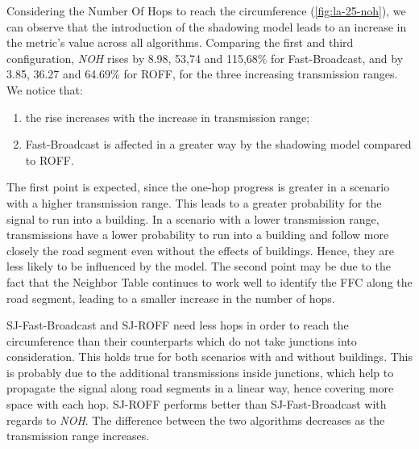		
		Considering the Number Of Hops to reach the circumference (\ref{fig:la-25-noh}), we can observe that the introduction of the shadowing model leads to an increase in the metric's value across all algorithms. Comparing the first and third configuration, \textit{NOH} rises by 8.98, 53,74 and 115,68\% for Fast-Broadcast, and by 3.85, 36.27 and 64.69\% for ROFF, for the three increasing transmission ranges. We notice that:
		\begin{enumerate}
			\item the rise increases with the increase in transmission range;
			\item Fast-Broadcast is affected in a greater way by the shadowing model compared to ROFF.
		\end{enumerate}
		The first point is expected, since the one-hop progress is greater in a scenario with a higher transmission range. This leads to a greater probability for the signal to run into a building. In a scenario with a lower transmission range, transmissions have a lower probability to run into a building and follow more closely the road segment even without the effects of buildings. Hence, they are less likely to be influenced by the model. The second point may be due to the fact that the Neighbor Table continues to work well to identify the FFC along the road segment, leading to a smaller increase in the number of hops.
		
		
		SJ-Fast-Broadcast and SJ-ROFF need less hops in order to reach the circumference than their counterparts which do not take junctions into consideration. This holds true for both scenarios with and without buildings. This is probably due to the additional transmissions inside junctions, which help to propagate the signal along road segments in a linear way, hence covering more space with each hop. SJ-ROFF performs better than SJ-Fast-Broadcast with regards to \textit{NOH}. The difference between the two algorithms decreases as the transmission range increases.
		
